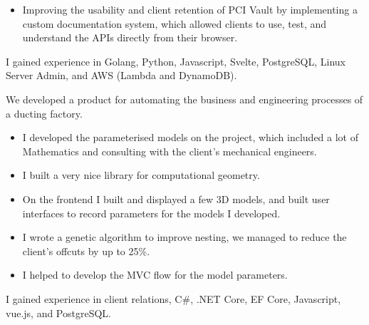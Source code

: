 \documentclass[a4paper]{twentysecondcv} %
\begin{document}
\begin{twenty}
{\begin{itemize}
            \item Improving the usability and client retention of PCI Vault by implementing a custom documentation system, which allowed clients to use, test, and understand the APIs directly from their browser.
        \end{itemize}
        I gained experience in Golang, Python, Javascript, Svelte, PostgreSQL, Linux Server Admin, and AWS (Lambda and DynamoDB).}
    {We developed a product for automating the business and engineering processes of a ducting factory.
    \begin{itemize}
        \item I developed the parameterised models on the project, which included a lot of Mathematics and consulting with the client's mechanical engineers.
        \item I built a very nice library for computational geometry.
        \item On the frontend I built and displayed a few 3D models, and built user interfaces to record parameters for the models I developed.
        \item I wrote a genetic algorithm to improve nesting, we managed to reduce the client's offcuts by up to 25\%.
        \item I helped to develop the MVC flow for the model parameters.
    \end{itemize}
    I gained experience in client relations, C\#, .NET Core, EF Core, Javascript, vue.js, and PostgreSQL.}
\end{twenty}

\newpage %

\makeprofile %
\end{document}
